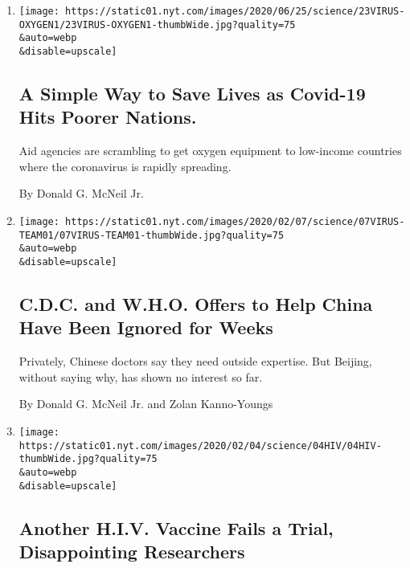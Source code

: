 \begin{enumerate}
\def\labelenumi{\arabic{enumi}.}
\item
  \href{/2020/06/23/health/coronavirus-oxygen-africa.html}{}

  \texttt{[image: https://static01.nyt.com/images/2020/06/25/science/23VIRUS-OXYGEN1/23VIRUS-OXYGEN1-thumbWide.jpg?quality=75\\\&auto=webp\\\&disable=upscale]}

  \hypertarget{a-simple-way-to-save-lives-as-covid-19-hits-poorer-nations}{%
  \subsection{A Simple Way to Save Lives as Covid-19 Hits Poorer
  Nations.}\label{a-simple-way-to-save-lives-as-covid-19-hits-poorer-nations}}

  Aid agencies are scrambling to get oxygen equipment to low-income
  countries where the coronavirus is rapidly spreading.

  By Donald G. McNeil Jr.
\item
  \href{/2020/02/07/health/cdc-coronavirus-china.html}{}

  \texttt{[image: https://static01.nyt.com/images/2020/02/07/science/07VIRUS-TEAM01/07VIRUS-TEAM01-thumbWide.jpg?quality=75\\\&auto=webp\\\&disable=upscale]}

  \hypertarget{cdc-and-who-offers-to-help-china-have-been-ignored-for-weeks}{%
  \subsection{C.D.C. and W.H.O. Offers to Help China Have Been Ignored
  for
  Weeks}\label{cdc-and-who-offers-to-help-china-have-been-ignored-for-weeks}}

  Privately, Chinese doctors say they need outside expertise. But
  Beijing, without saying why, has shown no interest so far.

  By Donald G. McNeil Jr. and Zolan Kanno-Youngs
\item
  \href{/2020/02/04/health/hiv-vaccine.html}{}

  \texttt{[image: https://static01.nyt.com/images/2020/02/04/science/04HIV/04HIV-thumbWide.jpg?quality=75\\\&auto=webp\\\&disable=upscale]}

  \hypertarget{another-hiv-vaccine-fails-a-trial-disappointing-researchers}{%
  \subsection{Another H.I.V. Vaccine Fails a Trial, Disappointing
  Researchers}\label{another-hiv-vaccine-fails-a-trial-disappointing-researchers}}


\end{enumerate}
